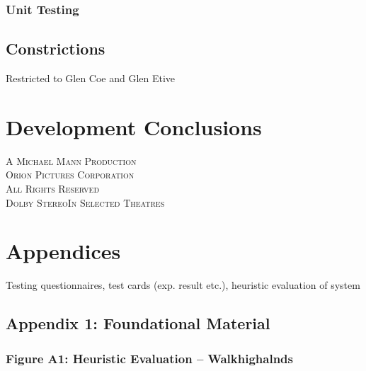 \documentclass[11pt, english]{article}
\begin{document}
		\subsubsection{Unit Testing}

	\subsection{Constrictions}

	Restricted to Glen Coe and Glen Etive

\newpage

\section{Development Conclusions}\label{ch8}

	\vspace{\fill}

	\begin{center}
		\textsc{A Michael Mann Production}\\
		\textsc{ Orion Pictures Corporation}\\
		\textsc{\small{All Rights Reserved}}\\
		\textsc{Dolby Stereo}\texttrademark \textsc{In Selected Theatres}
	\end{center}

\newpage



\section*{Appendices}

	Testing questionnaires, test cards (exp. result etc.), heuristic evaluation of system

	\subsection*{Appendix 1: Foundational Material}

		\subsubsection*{Figure A1: Heuristic Evaluation -- Walkhighalnds}
\end{document}
